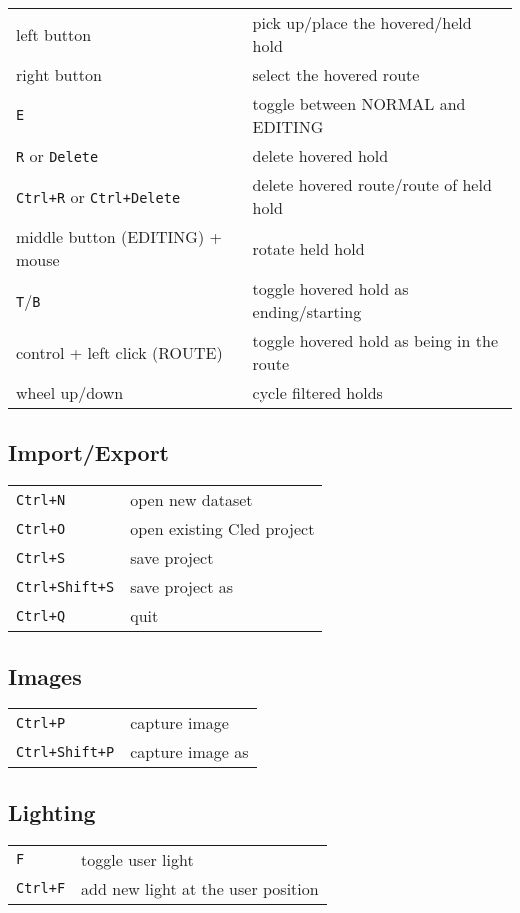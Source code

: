 \begin{tabular}[]{@{}ll@{}}
\toprule
left button & pick up/place the hovered/held hold \\
right button & select the hovered route \\
\verb|E| & toggle between NORMAL and EDITING \\
\verb|R| or \verb|Delete| & delete hovered hold \\
\verb|Ctrl+R| or \verb|Ctrl+Delete| & delete hovered route/route of held hold \\
middle button (EDITING) + mouse & rotate held hold \\
\verb|T|/\verb|B| & toggle hovered hold as ending/starting \\
control + left click (ROUTE) & toggle hovered hold as being in the
route \\
wheel up/down & cycle filtered holds \\
\bottomrule
\end{tabular}

\subsection{Import/Export}

\begin{tabular}[]{@{}ll@{}}
\toprule
\verb|Ctrl+N| & open new dataset \\
\verb|Ctrl+O| & open existing Cled project \\
\verb|Ctrl+S| & save project \\
\verb|Ctrl+Shift+S| & save project as \\
\verb|Ctrl+Q| & quit \\
\bottomrule
\end{tabular}

\subsection{Images}

\begin{tabular}[]{@{}ll@{}}
\toprule
\verb|Ctrl+P| & capture image \\
\verb|Ctrl+Shift+P| & capture image as \\
\bottomrule
\end{tabular}

\subsection{Lighting}

\begin{tabular}[]{@{}ll@{}}
\toprule
\verb|F| & toggle user light \\
\verb|Ctrl+F| & add new light at the user position \\
\bottomrule
\end{tabular}

